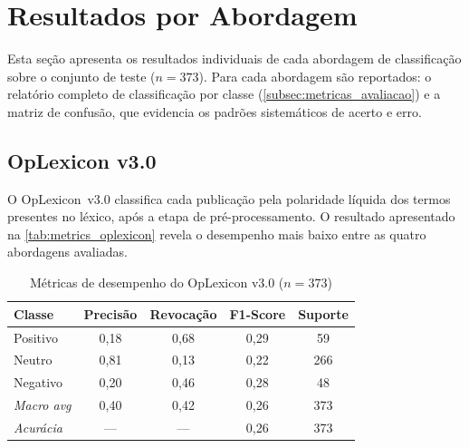 
\section{Resultados por Abordagem}
\label{sec:resultados_abordagem}

Esta seção apresenta os resultados individuais de cada abordagem de classificação sobre o conjunto de teste ($n = 373$). Para cada abordagem são reportados: o relatório completo de classificação por classe (\autoref{subsec:metricas_avaliacao}) e a matriz de confusão, que evidencia os padrões sistemáticos de acerto e erro.



\subsection{OpLexicon v3.0}
\label{subsec:res_oplexicon}

O OpLexicon~v3.0 \cite{souza2011oplexicon} classifica cada publicação pela polaridade líquida dos termos presentes no léxico, após a etapa de pré-processamento. O resultado apresentado na \autoref{tab:metrics_oplexicon} revela o desempenho mais baixo entre as quatro abordagens avaliadas.


\begin{table}[!htbp]
	\caption[Métricas de desempenho — OpLexicon v3.0]{Métricas de desempenho do OpLexicon v3.0 ($n = 373$)}
	\label{tab:metrics_oplexicon}
	\centering
	\begin{tabular}{lcccc}
		\hline
		\textbf{Classe}    & \textbf{Precisão} & \textbf{Revocação} & \textbf{F1-Score} & \textbf{Suporte} \\
		\hline		
		Positivo           & 0,18              & 0,68               & 0,29              & 59  \\
		\hline
		Neutro             & 0,81              & 0,13               & 0,22              & 266 \\
		\hline
		Negativo           & 0,20              & 0,46               & 0,28              & 48  \\
		\hline
		\textit{Macro avg} & 0,40              & 0,42               & 0,26              & 373 \\
		\hline
		\textit{Acurácia}  & ---               & ---                & 0,26              & 373 \\
		\hline
	\end{tabular}
\end{table}


